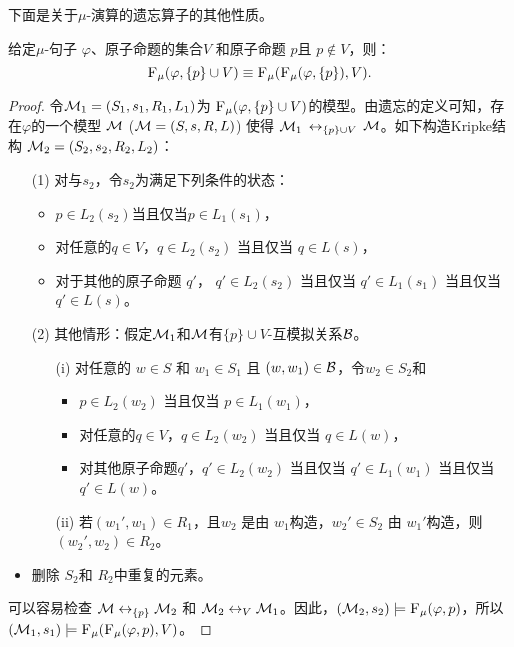


下面是关于$\mu$-演算的遗忘算子的其他性质。


\begin{proposition}[Modularity]\label{chapter06:disTF}  给定$\mu$-句子 $\varphi$、原子命题的集合$V$ 和原子命题 $p$且 $p \notin V$，则：
	\[
	{\textsc{F}_{\textsc{$\mu$}}}(\varphi, \{p\} \cup V) \equiv {\textsc{F}_{\textsc{$\mu$}}}({\textsc{F}_{\textsc{$\mu$}}}(\varphi, \{p\}), V).
	\]
\end{proposition}
\begin{proof}
	令${\cal M}_1=(S_1, s_1, R_1, L_1)$为 ${\textsc{F}_{\textsc{$\mu$}}}(\varphi, \{p\} \cup V)$的模型。由遗忘的定义可知，存在$\varphi$的一个模型 ${\cal M}$ (${\cal M} = (S, s, R,L)$) 使得 ${\cal M}_1$ $\leftrightarrow_{\{p\} \cup V}$ ${\cal M}$。如下构造Kripke结构 ${\cal M}_2 = (S_2, s_2, R_2, L_2)$：
	\begin{itemize}
		\item[(1)] 对与$s_2$，令$s_2$为满足下列条件的状态：
		\begin{itemize}
			\item $p \in L_2(s_2)$当且仅当$p \in L_1(s_1)$，
			\item 对任意的$q \in V$，$q \in L_2(s_2)$ 当且仅当 $q\in L(s)$，
			\item 对于其他的原子命题 $q'$， $q' \in L_2(s_2)$ 当且仅当 $q' \in L_1(s_1)$ 当且仅当 $q'\in L(s)$。
		\end{itemize}
		\item[(2)] 其他情形：假定${\cal M}_1$和${\cal M}$有$\{p\} \cup V$-互模拟关系${\cal B}$。
		\begin{itemize}
			\item[(i)] 对任意的 $w \in S$ 和 $w_1 \in S_1$ 且 $(w,w_1)\in {\cal B}$，令$w_2 \in S_2$和
			\begin{itemize}
				\item $p \in L_2(w_2)$ 当且仅当 $p \in L_1(w_1)$，
				\item 对任意的$q \in V$，$q \in L_2(w_2)$ 当且仅当 $q\in L(w)$，
				\item 对其他原子命题$q'$，$q' \in L_2(w_2)$ 当且仅当 $q' \in L_1(w_1)$ 当且仅当 $q'\in L(w)$。
			\end{itemize}
			\item[(ii)] 若$(w_1', w_1)\in R_1$，且$w_2$ 是由 $w_1$构造，$w_2'\in S_2$ 由 $w_1'$构造，则$(w_2', w_2)\in R_2$。
		\end{itemize}
		\item 删除 $S_2$和 $R_2$中重复的元素。
	\end{itemize}
	可以容易检查 ${\cal M} \leftrightarrow_{\{p\}} {\cal M}_2$ 和 ${\cal M}_2 \leftrightarrow_V {\cal M}_1$。因此，$({\cal M}_2, s_2) \models {\textsc{F}_{\textsc{$\mu$}}}(\varphi, p)$，所以 $({\cal M}_1, s_1) \models {\textsc{F}_{\textsc{$\mu$}}}({\textsc{F}_{\textsc{$\mu$}}}(\varphi, p), V)$。
	

\end{proof}
